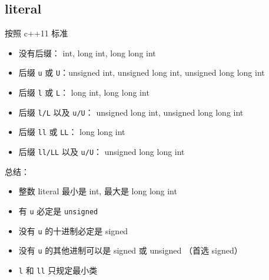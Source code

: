 \subsection{literal}
按照 c++11 标准
\begin{itemize}
\item 没有后缀： int, long int, long long int
\item 后缀 \verb|u| 或 \verb|U|：unsigned int, unsigned long int, unsigned long long int
\item 后缀 \verb|l| 或 \verb|L|： long int, long long int
\item 后缀 \verb|l/L| 以及 \verb|u/U|： unsigned long int, unsigned long long int
\item 后缀 \verb|ll| 或 \verb|LL|： long long int
\item 后缀 \verb|ll/LL| 以及 \verb|u/U|： unsigned long long int
\end{itemize}

总结：
\begin{itemize}
\item 整数 literal 最小是 int, 最大是 long long int
\item 有 \verb|u| 必定是 \verb|unsigned|
\item 没有 \verb|u| 的十进制必定是 signed
\item 没有 \verb|u| 的其他进制可以是 signed 或 unsigned （首选 signed）
\item \verb|l| 和 \verb|ll| 只规定最小类
\end{itemize}
